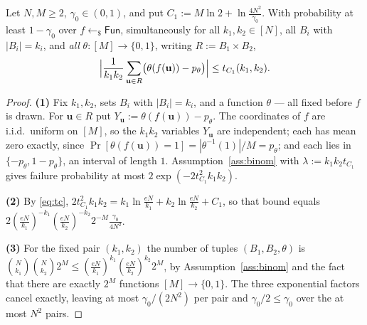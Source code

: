 \documentclass{aicr-solution}
\newcommand{\Fun}{\mathsf{Fun}}
\newcommand{\Prob}[1]{\Pr\!\left[#1\right]}
\newcommand{\bits}{\{0,1\}}
\newcommand{\vu}{\mathbf{u}}
\begin{document}
\begin{lemma}\label{lem:B}
Let $N,M \ge 2$, $\gamma_0 \in (0,1)$, and put
$C_1 := M \ln 2 + \ln \frac{4N^{2}}{\gamma_0}$. With probability at least
$1-\gamma_0$ over $f \gets_{\$} \Fun$, simultaneously for all $k_1,k_2 \in [N]$,
all $B_i$ with $|B_i| = k_i$, and \emph{all} $\theta : [M] \to \bits$, writing
$R := B_1 \times B_2$,
\[
  \Bigl|\frac{1}{k_1k_2}\sum_{\vu \in R}
  \bigl(\theta(f(\vu)) - p_\theta\bigr)\Bigr| \le t_{C_1}(k_1,k_2).
\]
\end{lemma}

\begin{proof}
\textbf{(1)} Fix $k_1,k_2$, sets $B_i$ with $|B_i| = k_i$, and a function $\theta$
--- all fixed before $f$ is drawn. For $\vu \in R$ put
$Y_{\vu} := \theta(f(\vu)) - p_\theta$. The coordinates of $f$ are i.i.d.\ uniform
on $[M]$, so the $k_1k_2$ variables $Y_{\vu}$ are independent; each has mean zero
exactly, since $\Prob{\theta(f(\vu)) = 1} = |\theta^{-1}(1)|/M = p_\theta$; and each
lies in $\{-p_\theta, 1-p_\theta\}$, an interval of length $1$.
Assumption~\ref{ass:binom} with $\lambda := k_1k_2 t_{C_1}$ gives failure
probability at most $2\exp(-2t_{C_1}^{2}k_1k_2)$.

\textbf{(2)} By \eqref{eq:tc},
$2t_{C_1}^{2}k_1k_2 = k_1 \ln\frac{eN}{k_1} + k_2 \ln\frac{eN}{k_2} + C_1$, so that
bound equals
$2(\frac{eN}{k_1})^{-k_1}(\frac{eN}{k_2})^{-k_2}2^{-M}\frac{\gamma_0}{4N^{2}}$.

\textbf{(3)} For the fixed pair $(k_1,k_2)$ the number of tuples
$(B_1,B_2,\theta)$ is
$\binom{N}{k_1}\binom{N}{k_2}2^{M} \le (\frac{eN}{k_1})^{k_1}(\frac{eN}{k_2})^{k_2}2^{M}$,
by Assumption~\ref{ass:binom} and the fact that there are exactly $2^{M}$
functions $[M] \to \bits$. The three exponential factors cancel exactly, leaving at
most $\gamma_0/(2N^{2})$ per pair and $\gamma_0/2 \le \gamma_0$ over the at most
$N^{2}$ pairs.
\end{proof}
\end{document}
